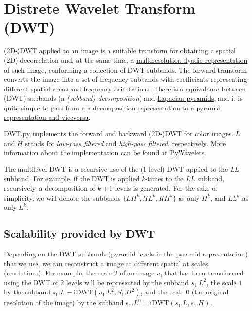 \section{Distrete Wavelet Transform (DWT)}
\href{https://en.wikipedia.org/wiki/Discrete_wavelet_transform}{(2D-)DWT}
applied to an image is a suitable transform for obtaining a spatial
(2D) decorrelation and, at the same time, a
\href{https://vicente-gonzalez-ruiz.github.io/image_transformations_for_coding/indexse24.html#x34-3400024}{multiresolution
  dyadic representation} of such image, conforming a collection of DWT
subbands. The forward transform converts the image into a set of
frequency subbands with coefficients representing different spatial
areas and frequency orientations. There is a equivalence between (DWT)
subbands (a \emph{(subband) decomposition}) and
\href{https://en.wikipedia.org/wiki/Pyramid_(image_processing)#Laplacian_pyramid}{Lapacian
  pyramids}, and it is quite simple to pass from a
\href{https://vicente-gonzalez-ruiz.github.io/pyramids-and-wavelets/}{a
  decomposition representation to a pyramid representation and
  viceversa}.

\href{https://github.com/vicente-gonzalez-ruiz/MCDWT/blob/master/src/DWT.py}{DWT.py}
implements the forward and backward (2D-)DWT for color images. $L$ and
$H$ stands for \emph{low-pass filtered} and \emph{high-pass filtered},
respectively.  More information about the implementation can be found at
\href{https://pywavelets.readthedocs.io/en/latest/index.html}{PyWavelets}.



The multilevel DWT is a recursive use of the (1-level) DWT applied to
the $LL$ subband. For example, if the DWT is applied $k$-times to the
$LL$ subband, recursively, a decomposition of $k+1$-levels is generated. For
the sake of simplicity, we will denote the subbands $\{LH^k, HL^k,
HH^k\}$ as only $H^k$, and $LL^k$ as only $L^k$.

\subsection{Scalability provided by DWT}
Depending on the DWT subbands (pyramid levels in the pyramid
representation) that we use, we can reconstruct a image at different
spatial at scales (resolutions). For example, the scale $2$ of an
image $s_1$ that has been transformed using the DWT of 2 levels will
be represented by the subband $s_1.L^2$, the scale $1$ by the subband
$s_1.L=\text{iDWT}(s_1.L^2, S_1.H^2)$, and the scale $0$ (the original
resolution of the image) by the subband $s_1.L^0=\text{iDWT}(s_1.L,
s_1.H)$.

